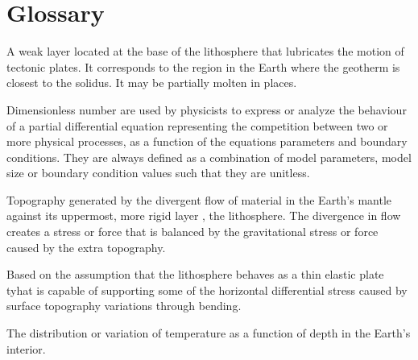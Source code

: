\documentclass[letterpaper,10pt,english]{jupyterBook}
\begin{document}
\sphinxstepscope


\chapter{Glossary}
\label{\detokenize{glossary:glossary}}\label{\detokenize{glossary::doc}}\begin{description}
\sphinxAtStartPar
A weak layer located at the base of the lithosphere that lubricates the motion of tectonic plates. It corresponds to the region in the Earth where the geotherm is closest to the solidus. It may be partially molten in places.

\sphinxAtStartPar
Dimensionless number are used by physicists to express or analyze the behaviour of a partial differential equation representing the competition between two or more physical processes, as a function of the equations parameters and boundary conditions. They are always defined as a combination of model parameters, model size or boundary condition values such that they are unitless.

\sphinxAtStartPar
Topography generated by the divergent flow of material in the Earth’s mantle against its uppermost, more rigid layer , the lithosphere. The divergence in flow creates a stress or force that is balanced by the gravitational stress or force caused by the extra topography.

\sphinxAtStartPar
Based on the assumption that the lithosphere behaves as a thin elastic plate tyhat is capable of supporting some of the horizontal differential stress caused by surface topography variations through bending.

\sphinxAtStartPar
The distribution or variation of temperature as a function of depth in the Earth’s interior.


\end{description}
\end{document}
